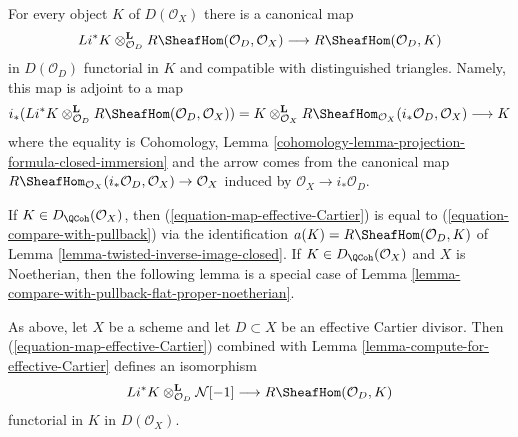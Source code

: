 \noindent
For every object $K$ of $D(\mathcal{O}_X)$ there is a canonical map
\begin{equation}
\label{equation-map-effective-Cartier}
Li^*K
\otimes_{\mathcal{O}_D}^\mathbf{L}
R\SheafHom(\mathcal{O}_D, \mathcal{O}_X)
\longrightarrow
R\SheafHom(\mathcal{O}_D, K)
\end{equation}
in $D(\mathcal{O}_D)$ functorial in $K$ and
compatible with distinguished triangles.
Namely, this map is adjoint to a map
$$
i_*(Li^*K \otimes^\mathbf{L}_{\mathcal{O}_D}
R\SheafHom(\mathcal{O}_D, \mathcal{O}_X)) =
K \otimes^\mathbf{L}_{\mathcal{O}_X}
R\SheafHom_{\mathcal{O}_X}(i_*\mathcal{O}_D, \mathcal{O}_X)
\longrightarrow K
$$
where the equality is
Cohomology, Lemma \ref{cohomology-lemma-projection-formula-closed-immersion}
and the arrow comes from the canonical map
$R\SheafHom_{\mathcal{O}_X}(i_*\mathcal{O}_D, \mathcal{O}_X) \to \mathcal{O}_X$
induced by $\mathcal{O}_X \to i_*\mathcal{O}_D$.

\medskip\noindent
If $K \in D_\QCoh(\mathcal{O}_X)$, then
(\ref{equation-map-effective-Cartier}) is equal to
(\ref{equation-compare-with-pullback}) via the identification
$a(K) = R\SheafHom(\mathcal{O}_D, K)$ of
Lemma \ref{lemma-twisted-inverse-image-closed}.
If $K \in D_\QCoh(\mathcal{O}_X)$ and $X$ is Noetherian, then
the following lemma is a special case of
Lemma \ref{lemma-compare-with-pullback-flat-proper-noetherian}.

\begin{lemma}
\label{lemma-sheaf-with-exact-support-effective-Cartier}
As above, let $X$ be a scheme and let $D \subset X$ be an
effective Cartier divisor. Then (\ref{equation-map-effective-Cartier})
combined with Lemma \ref{lemma-compute-for-effective-Cartier}
defines an isomorphism
$$
Li^*K \otimes_{\mathcal{O}_D}^\mathbf{L} \mathcal{N}[-1]
\longrightarrow
R\SheafHom(\mathcal{O}_D, K)
$$
functorial in $K$ in $D(\mathcal{O}_X)$.
\end{lemma}

